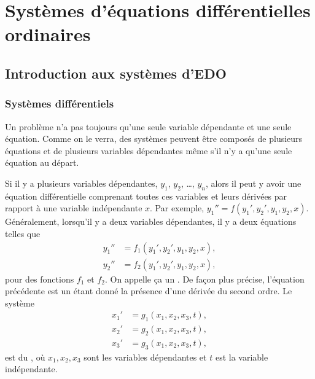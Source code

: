 \chapter{Systèmes d’équations différentielles ordinaires} \label{sys:chapter}


\section{Introduction aux systèmes d'EDO} \label{sec:introtosys}


\subsection{Systèmes différentiels}

Un problème n'a pas toujours qu'une seule variable dépendante et une seule équation. Comme on le verra, des systèmes peuvent être composés de plusieurs équations et de plusieurs variables dépendantes même s'il n'y a qu’une seule équation au départ.

Si il y a plusieurs variables dépendantes, $y_1$, $y_2$, \ldots, $y_n$,
alors
il peut y avoir une équation différentielle comprenant toutes ces variables et leurs dérivées par rapport à une variable indépendante $x$.
Par exemple, $y_1'' = f(y_1',y_2',y_1,y_2,x)$.
Généralement, lorsqu'il y a deux variables dépendantes, il y a deux équations telles que
\begin{align*}
y_1'' & = f_1(y_1',y_2',y_1,y_2,x) , \\
y_2'' & = f_2(y_1',y_2',y_1,y_2,x) ,
\end{align*}
pour des fonctions $f_1$ et $f_2$.  On appelle ça un
\emph{}.
De façon plus précise, l’équation précédente est un \emph{}
étant donné la présence d’une dérivée du second ordre. Le système
\begin{align*}
x_1' & = g_1(x_1,x_2,x_3,t) , \\
x_2' & = g_2(x_1,x_2,x_3,t) , \\
x_3' & = g_3(x_1,x_2,x_3,t) ,
\end{align*}
est du \emph{}, où $x_1,x_2,x_3$ sont les variables dépendantes et $t$ est la variable indépendante.

